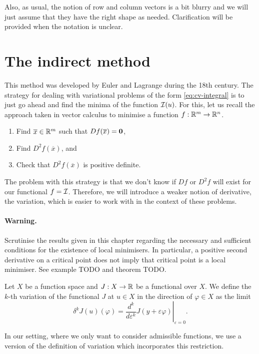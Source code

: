 Also, as usual, the notion of row and column vectors is a bit blurry and we
will just assume that they have the right shape as needed. Clarification will
be provided when the notation is unclear.


\section{The indirect method}

This method was developed by Euler and Lagrange during the 18th century. The
strategy for dealing with variational problems of the form
\eqref{eq:cv-integral} is to just go ahead and find the minima of the function
$\mathcal{I}(u)$. For this, let us recall the approach taken in vector calculus to
minimise a function $f: \mathbb{R}^m \to \mathbb{R}^n$.
\begin{enumerate}
  \item Find $\overline{x} \in \mathbb{R}^m$ such that $Df(\overline{x}) = \mathbf{0}$,
  \item Find $D^2f(\overline{x})$, and
  \item Check that $D^2f(\overline{x})$ is positive definite.
\end{enumerate}

The problem with this strategy is that we don't know if $Df$ or $D^2f$ will
exist for our functional $f = \mathcal{I}$. Therefore, we will introduce a weaker
notion of derivative, the variation, which is easier to work with in the
context of these problems.

\paragraph{Warning.} Scrutinise the results given in this chapter regarding the
necessary and sufficient conditions for the existence of local minimisers. In
particular, a positive second derivative on a critical point does not imply
that critical point is a local minimiser. See example TODO and theorem TODO.

\begin{dfn}

  Let $X$ be a function space and $J: X \to \mathbb{R}$ be a functional over $X$. We
  define the $k$-th variation of the functional $J$ at $u \in X$ in the
  direction of $\varphi \in X$ as the limit
  \[
    \delta^k J(u)(\varphi)
    = \left. \frac{d^k}{d\varepsilon^k} J(y + \varepsilon \varphi)\right|_{\varepsilon = 0}.
  \]
\end{dfn}

In our setting, where we only want to consider admissible functions, we use a
version of the definition of variation which incorporates this restriction.


